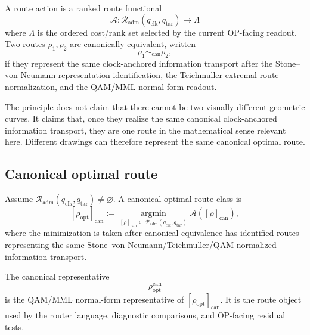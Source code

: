 \begin{definition}
\label{def:v410r10-route-action-canonical-equivalence}
A route action is a ranked route functional
\[
 \mathcal A:
 \mathcal R_{\mathrm{adm}}(q_{\mathrm{clk}},q_{\mathrm{tar}})
 \longrightarrow
 \Lambda
\]
where \(\Lambda\) is the ordered cost/rank set selected by the current
OP-facing readout. Two routes \(\rho_1,\rho_2\) are canonically equivalent,
written
\[
 \rho_1\sim_{\mathrm{can}}\rho_2,
\]
if they represent the same clock-anchored information transport after the
Stone--von Neumann representation identification, the Teichmuller extremal-route
normalization, and the QAM/MML normal-form readout.
\end{definition}

\begin{remark}
\label{rem:v410r10-uniqueness-means-canonical-uniqueness}
The principle does not claim that there cannot be two visually different
geometric curves. It claims that, once they realize the same canonical
clock-anchored information transport, they are one route in the mathematical
sense relevant here. Different drawings can therefore represent the same
canonical optimal route.
\end{remark}

\subsection{Canonical optimal route}
\label{subsec:v410r10-canonical-optimal-route}

\begin{definition}
\label{def:v410r10-canonical-optimal-route-class}
Assume \(\mathcal R_{\mathrm{adm}}(q_{\mathrm{clk}},q_{\mathrm{tar}})\neq
\varnothing\). A canonical optimal route class is
\[
 [\rho_{\mathrm{opt}}]_{\mathrm{can}}
 :=
 \operatorname*{argmin}_{[\rho]_{\mathrm{can}}
 \subseteq
 \mathcal R_{\mathrm{adm}}(q_{\mathrm{clk}},q_{\mathrm{tar}})}
 \mathcal A([\rho]_{\mathrm{can}}),
\]
where the minimization is taken after canonical equivalence has identified
routes representing the same Stone--von Neumann/Teichmuller/QAM-normalized
information transport.
\end{definition}

\begin{definition}
\label{def:v410r10-qam-mml-canonical-representative}
The canonical representative
\[
 \rho_{\mathrm{opt}}^{\mathrm{can}}
\]
is the QAM/MML normal-form representative of
\([\rho_{\mathrm{opt}}]_{\mathrm{can}}\). It is the route object used by the
router language, diagnostic comparisons, and OP-facing residual tests.
\end{definition}

